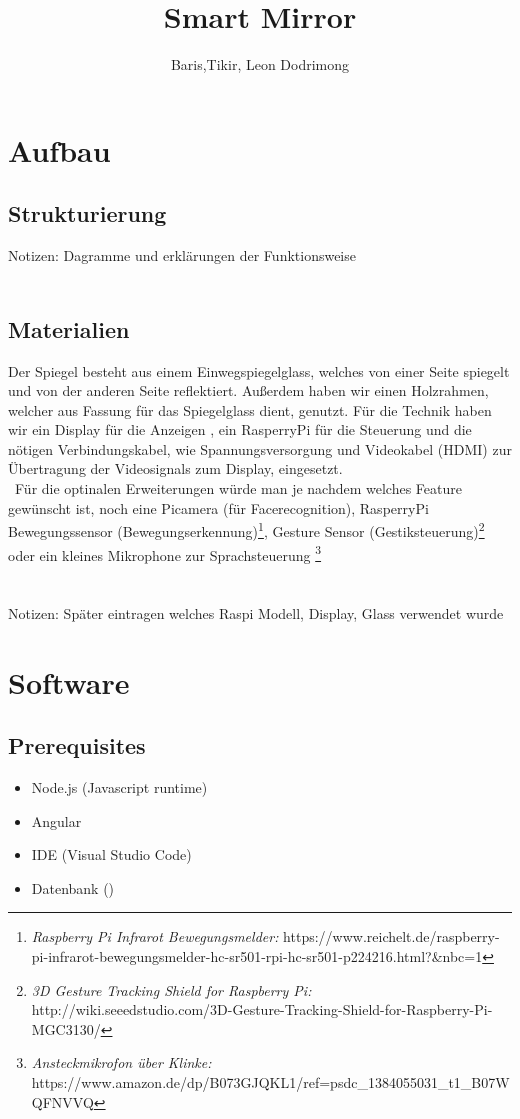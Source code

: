 \documentclass[a4paper,11pt]{article}
\author{Baris,Tikir, Leon Dodrimong}
\title{Smart Mirror}
\begin{document}
\maketitle
\newpage
\tableofcontents
\newpage




\section{Aufbau}
\subsection{Strukturierung}
Notizen: Dagramme und erklärungen der Funktionsweise\\\
\subsection{Materialien}
Der Spiegel besteht aus einem Einwegspiegelglass, welches von einer Seite spiegelt und von der anderen Seite reflektiert. Außerdem haben wir einen Holzrahmen, welcher aus Fassung für das Spiegelglass dient, genutzt. Für die Technik haben wir ein Display für die Anzeigen , ein RasperryPi für die Steuerung und die nötigen Verbindungskabel, wie Spannungsversorgung und Videokabel (HDMI) zur Übertragung der Videosignals zum Display, eingesetzt.\\\
Für die optinalen Erweiterungen würde man je nachdem welches Feature gewünscht ist, noch eine Picamera (für Facerecognition), RasperryPi Bewegungssensor (Bewegungserkennung)\footnote{\textit{ Raspberry Pi Infrarot Bewegungsmelder:} https://www.reichelt.de/raspberry-pi-infrarot-bewegungsmelder-hc-sr501-rpi-hc-sr501-p224216.html?\&nbc=1}, Gesture Sensor (Gestiksteuerung)\footnote{\textit{3D Gesture Tracking Shield for Raspberry Pi:}  http://wiki.seeedstudio.com/3D-Gesture-Tracking-Shield-for-Raspberry-Pi-MGC3130/} oder ein kleines Mikrophone zur Sprachsteuerung \footnote{\textit{Ansteckmikrofon über Klinke:} https://www.amazon.de/dp/B073GJQKL1/ref=psdc\_1384055031\_t1\_B07WQFNVVQ}
\\\\\\
Notizen: Später eintragen welches Raspi Modell, Display, Glass verwendet wurde

\section{Software}
\subsection{Prerequisites}
\begin{itemize}
\item Node.js (Javascript runtime)
\item Angular
\item IDE (Visual Studio Code)
\item Datenbank ()
\end{itemize}
\end{document}

